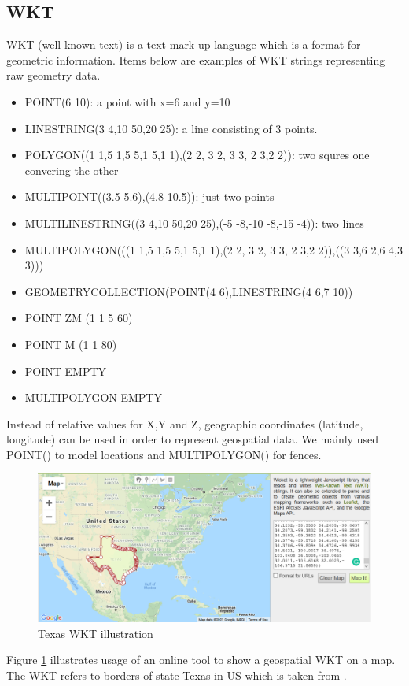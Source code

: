\documentclass[a4]{report}
\begin{document}
    \subsection{WKT}
    WKT (well known text) is a text mark up language which is a format for geometric information.
    Items below are examples of WKT strings representing raw geometry data.
    \begin{itemize}
        \item POINT(6 10): a point with x=6 and y=10
        \item LINESTRING(3 4,10 50,20 25): a line consisting of 3 points.
        \item POLYGON((1 1,5 1,5 5,1 5,1 1),(2 2, 3 2, 3 3, 2 3,2 2)): two squres one convering the other
        \item MULTIPOINT((3.5 5.6),(4.8 10.5)): just two points
        \item MULTILINESTRING((3 4,10 50,20 25),(-5 -8,-10 -8,-15 -4)): two lines
        \item MULTIPOLYGON(((1 1,5 1,5 5,1 5,1 1),(2 2, 3 2, 3 3, 2 3,2 2)),((3 3,6 2,6 4,3 3)))
        \item GEOMETRYCOLLECTION(POINT(4 6),LINESTRING(4 6,7 10))
        \item POINT ZM (1 1 5 60)
        \item POINT M (1 1 80)
        \item POINT EMPTY
        \item MULTIPOLYGON EMPTY
    \end{itemize}

    Instead of relative values for X,Y and Z, geographic coordinates (latitude, longitude) can be used in order to
    represent geospatial data.
    We mainly used POINT() to model locations and MULTIPOLYGON() for fences.

    \begin{figure}[ht]
        \centering
        \caption{Texas WKT illustration}
        \label{fig:texas}
        \includegraphics[width=\linewidth, scale=0.5]{images/texas.png}
    \end{figure}
    Figure \ref{fig:texas} illustrates usage of an online tool \cite{WKTtool} to show a geospatial WKT on a map.
    The WKT refers to borders of state Texas in US which is taken from \cite{WKTs}.
\end{document}
